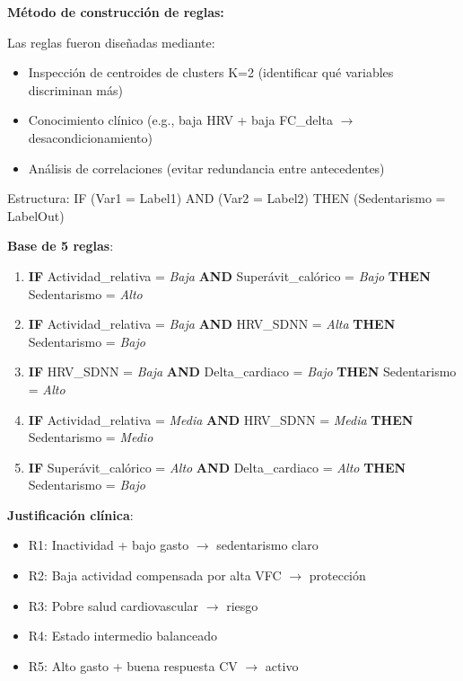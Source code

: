 \documentclass[12pt,letterpaper,twoside]{report}
\begin{document}
\begin{estadisticobox}
\textbf{Método de construcción de reglas:}

Las reglas fueron diseñadas mediante:
\begin{itemize}[noitemsep]
    \item Inspección de centroides de clusters K=2 (identificar qué variables discriminan más)
    \item Conocimiento clínico (e.g., baja HRV + baja FC\_delta $\to$ desacondicionamiento)
    \item Análisis de correlaciones (evitar redundancia entre antecedentes)
\end{itemize}

Estructura: IF (Var1 = Label1) AND (Var2 = Label2) THEN (Sedentarismo = LabelOut)
\end{estadisticobox}

\begin{reglabox}
\textbf{Base de 5 reglas}:

\begin{enumerate}[label=\textbf{R\arabic*:}]
    \item \textbf{IF} Actividad\_relativa = \textit{Baja} \textbf{AND} Superávit\_calórico = \textit{Bajo} \textbf{THEN} Sedentarismo = \textit{Alto}
    
    \item \textbf{IF} Actividad\_relativa = \textit{Baja} \textbf{AND} HRV\_SDNN = \textit{Alta} \textbf{THEN} Sedentarismo = \textit{Bajo}
    
    \item \textbf{IF} HRV\_SDNN = \textit{Baja} \textbf{AND} Delta\_cardiaco = \textit{Bajo} \textbf{THEN} Sedentarismo = \textit{Alto}
    
    \item \textbf{IF} Actividad\_relativa = \textit{Media} \textbf{AND} HRV\_SDNN = \textit{Media} \textbf{THEN} Sedentarismo = \textit{Medio}
    
    \item \textbf{IF} Superávit\_calórico = \textit{Alto} \textbf{AND} Delta\_cardiaco = \textit{Alto} \textbf{THEN} Sedentarismo = \textit{Bajo}
\end{enumerate}

\textbf{Justificación clínica}:
\begin{itemize}[noitemsep]
    \item R1: Inactividad + bajo gasto $\to$ sedentarismo claro
    \item R2: Baja actividad compensada por alta VFC $\to$ protección
    \item R3: Pobre salud cardiovascular $\to$ riesgo
    \item R4: Estado intermedio balanceado
    \item R5: Alto gasto + buena respuesta CV $\to$ activo
\end{itemize}
\end{reglabox}
\end{document}

